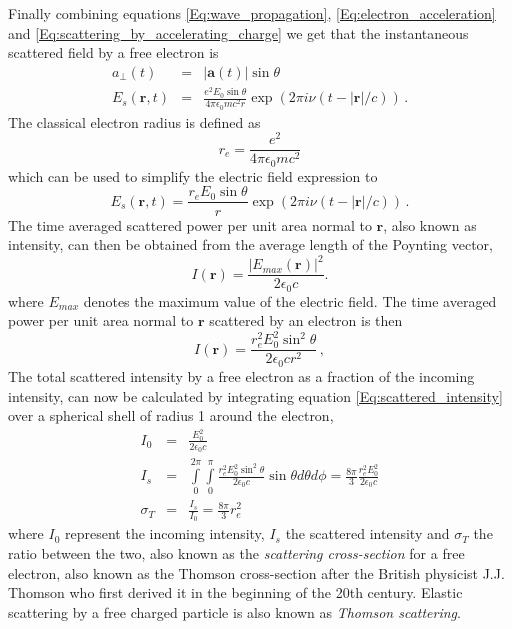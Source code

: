 Finally combining equations \ref{Eq:wave_propagation}, \ref{Eq:electron_acceleration} and \ref{Eq:scattering_by_accelerating_charge} we get that the instantaneous scattered field by a free electron is
\begin{eqnarray}
a_{\perp}(t) & = & |\mathbf a(t)| \sin \theta  \\
E_s(\mathbf r,t) & = & \frac{e^2 E_0 \sin \theta }{4 \pi \epsilon_0 m c^2 r}
\exp(2 \pi i \nu (t -| \mathbf r|/c)) \, . 
\label{Eq:scattering_by_electron}
\end{eqnarray}
The classical electron radius is defined as
\begin{equation}
r_e = \frac{e^2}{4 \pi \epsilon_0 m c^2}
\end{equation}
which can be used to simplify the electric field expression to
\begin{equation}
E_s(\mathbf r,t) = \frac{r_e E_0 \sin \theta }{r} \exp(2 \pi i \nu (t -| \mathbf
r|/c))  \, .
\label{Eq:scattering_by_electron_simplified}
\end{equation}
The time averaged scattered power per unit area normal to $\mathbf r$, also
known as intensity, can then be obtained from the average length of the Poynting vector,
\begin{equation} 
I(\mathbf r) = \frac{ |E_{max}(\mathbf r)|^2 }{2 \epsilon_0 c} .
\label{Eq:poynting_vector}
\end{equation}
where $E_{max}$ denotes the maximum value of the electric field.
The time averaged power per unit area normal to $\mathbf r$ scattered by an electron is then
\begin{equation}
I(\mathbf r)  = \frac{r_e^2 E_0^2 \sin^2 \theta }{2 \epsilon_0 c r^2} \, ,
\label{Eq:scattered_intensity}
\end{equation}
The total scattered intensity by a free electron as a fraction of the incoming
intensity, can now be calculated by integrating equation
\ref{Eq:scattered_intensity} over a spherical shell of radius 1 around the electron,
\begin{eqnarray}
I_0 & = & \frac{E_0^2}{2 \epsilon_0 c} \\
I_s & = & \int\limits_0^{2 \pi} \int\limits_0^{\pi} \frac{r_e^2 E_0^2 \sin^2
  \theta }{2 \epsilon_0 c} \sin \theta d \theta d\phi = \frac{8 \pi}{3}
\frac{r_e^2 E_0^2}{2 \epsilon_0 c} \\
\sigma_T & = & \frac{I_s}{I_0} = \frac{8 \pi}{3} r_e^2
\end{eqnarray}
where $I_0$ represent the incoming intensity, $I_s$ the scattered intensity and
$\sigma_T$ the ratio between the two, also known as the {\em scattering cross-section}
for a free electron, also known as the Thomson cross-section after the British
physicist J.J. Thomson who first derived it in the beginning of the 20th
century. Elastic scattering by a free charged particle is also known as {\em Thomson scattering}.

